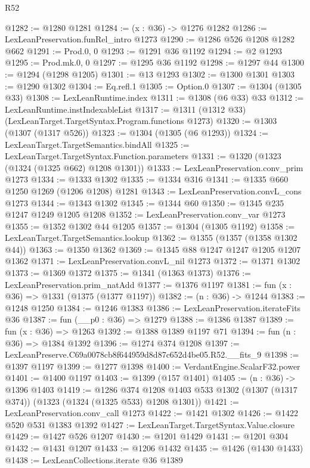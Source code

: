 \begin{lexlean}{R52}
\begin{coremodule}
@1282 := @1280 @1281
@1284 := (x : @36) -> @1276 @1282
@1286 := LexLeanPreservation.funRel_intro @1273
@1290 := @1286 @526 @1208 @1282 @662
@1291 := Prod.{0, 0}
@1293 := @1291 @36 @1192
@1294 := @2 @1293
@1295 := Prod.mk.{0, 0}
@1297 := @1295 @36 @1192
@1298 := @1297 @44
@1300 := @1294 (@1298 @1205)
@1301 := @13 @1293
@1302 := @1300 @1301
@1303 := @1290 @1302
@1304 := Eq.refl.{1}
@1305 := Option.{0}
@1307 := @1304 (@1305 @33)
@1308 := LexLeanRuntime.index
@1311 := @1308 (@6 @33) @33
@1312 := LexLeanRuntime.instIndexableList
@1317 := @1311 (@1312 @33) (LexLeanTarget.TargetSyntax.Program.functions @1273)
@1320 := @1303 (@1307 (@1317 @526))
@1323 := @1304 (@1305 (@6 @1293))
@1324 := LexLeanTarget.TargetSemantics.bindAll
@1325 := LexLeanTarget.TargetSyntax.Function.parameters
@1331 := @1320 (@1323 (@1324 (@1325 @662) @1208 @1301))
@1333 := LexLeanPreservation.conv_prim @1273
@1334 := @1333 @1302
@1335 := @1334 @316
@1341 := @1335 @660 @1250 @1269 (@1206 @1208) @1281
@1343 := LexLeanPreservation.convL_cons @1273
@1344 := @1343 @1302
@1345 := @1344 @60
@1350 := @1345 @235 @1247 @1249 @1205 @1208
@1352 := LexLeanPreservation.conv_var @1273
@1355 := @1352 @1302 @44 @1205
@1357 := @1304 (@1305 @1192)
@1358 := LexLeanTarget.TargetSemantics.lookup
@1362 := @1355 (@1357 (@1358 @1302 @44))
@1363 := @1350 @1362
@1369 := @1345 @88 @1247 @1247 @1205 @1207 @1362
@1371 := LexLeanPreservation.convL_nil @1273
@1372 := @1371 @1302
@1373 := @1369 @1372
@1375 := @1341 (@1363 @1373)
@1376 := LexLeanPreservation.prim_natAdd
@1377 := @1376 @1197
@1381 := fun (x : @36) => @1331 (@1375 (@1377 @1197))
@1382 := (n : @36) -> @1244
@1383 := @1248 @1250
@1384 := @1246 @1383
@1386 := LexLeanPreservation.iterateFits @36
@1387 := fun (__p0 : @36) => @1279
@1388 := @1386 @1387
@1389 := fun (x : @36) => @1263
@1392 := @1388 @1389 @1197 @71
@1394 := fun (n : @36) => @1384 @1392
@1396 := @1274 @374 @1208
@1397 := LexLeanPreserve.C69a0078cb8f644959d8d87c652d4be05.R52.__fits_9
@1398 := @1397 @1197
@1399 := @1277 @1398
@1400 := VerdantEngine.ScalarF32.power
@1401 := @1400 @1197
@1403 := @1399 (@157 @1401)
@1405 := (n : @36) -> @1396 @1403
@1419 := @1286
    @374
    @1208
    @1403
    @533
    @1302
    (@1307 (@1317 @374))
    (@1323 (@1324 (@1325 @533) @1208 @1301))
@1421 := LexLeanPreservation.conv_call @1273
@1422 := @1421 @1302
@1426 := @1422 @520 @531 @1383 @1392
@1427 := LexLeanTarget.TargetSyntax.Value.closure
@1429 := @1427 @526 @1207
@1430 := @1201 @1429
@1431 := @1201 @304
@1432 := @1431 @1207
@1433 := @1206 @1432
@1435 := @1426 (@1430 @1433)
@1438 := LexLeanCollections.iterate @36 @1389

\end{coremodule}
\end{lexlean}
